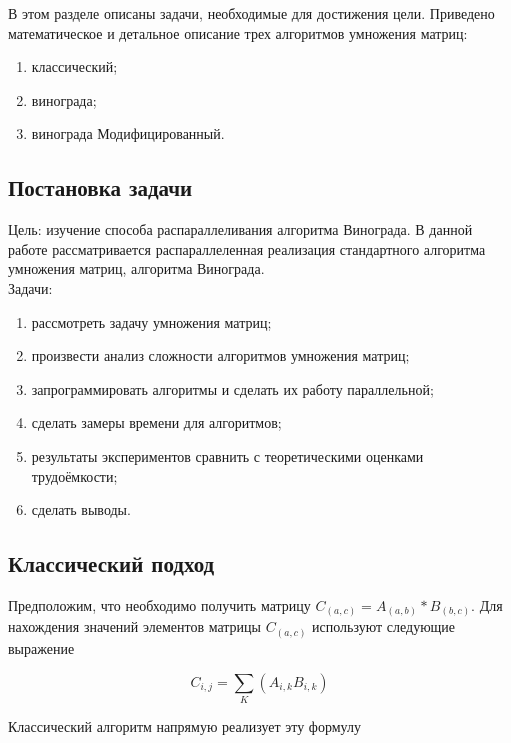 \documentclass[../main.tex]{subfiles}
\begin{document}
	
	В этом разделе описаны задачи, необходимые для достижения цели. Приведено математическое и детальное описание трех алгоритмов умножения матриц:
	
	\begin{enumerate}[1)]
		\item классический;
		\item винограда;
		\item винограда Модифицированный.
	\end{enumerate}
	
	\subsection{Постановка задачи}
	
	Цель: изучение способа распараллеливания алгоритма Винограда. 
	В данной работе рассматривается распараллеленная реализация стандартного алгоритма умножения матриц, алгоритма Винограда. \\
	
	Задачи:
	\begin{enumerate}[1)]
		\item рассмотреть задачу умножения матриц;
		\item произвести анализ сложности алгоритмов умножения матриц;
		\item запрограммировать алгоритмы и сделать их работу параллельной;
		\item сделать замеры времени для алгоритмов;
		\item результаты экспериментов сравнить с теоретическими оценками трудоёмкости;
		\item сделать выводы.
	\end{enumerate}

	\subsection{Классический подход}
	
	Предположим, что необходимо получить матрицу $C_{(a,c)} = A_{(a,b)} * B_{(b,c)}$. Для нахождения значений элементов матрицы $C_{(a,c)}$ используют следующие выражение\cite{makkonell}
	
	\begin{center}
		\begin{equation}
		\label{math:1}
		C_{i,j} = \sum_{K}(A_{i, k}B_{i,k})
		\end{equation}
	\end{center}
	
	Классический алгоритм напрямую реализует эту формулу
	
\end{document}
